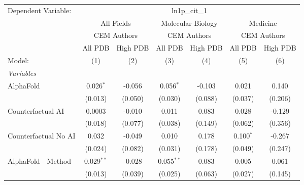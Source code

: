 \begingroup
\centering
\begin{tabular}{lcccccc}
   \tabularnewline \midrule \midrule
   Dependent Variable: & \multicolumn{6}{c}{ln1p\_cit\_1}\\
 & \multicolumn{2}{c}{All Fields} & \multicolumn{2}{c}{Molecular Biology} & \multicolumn{2}{c}{Medicine} \\
\cmidrule(lr){2-3} \cmidrule(lr){4-5} \cmidrule(lr){6-7}
 & \multicolumn{2}{c}{CEM Authors} & \multicolumn{2}{c}{CEM Authors} & \multicolumn{2}{c}{CEM Authors} \\
\cmidrule(lr){2-3} \cmidrule(lr){4-5} \cmidrule(lr){6-7}
 & \multicolumn{1}{c}{All PDB} & \multicolumn{1}{c}{High PDB} & \multicolumn{1}{c}{All PDB} & \multicolumn{1}{c}{High PDB} & \multicolumn{1}{c}{All PDB} & \multicolumn{1}{c}{High PDB} \\
\cmidrule(lr){2-2} \cmidrule(lr){3-3} \cmidrule(lr){4-4} \cmidrule(lr){5-5} \cmidrule(lr){6-6} \cmidrule(lr){7-7}
   Model:                                                     & (1)          & (2)           & (3)          & (4)     & (5)         & (6)\\  
   \midrule
   \emph{Variables}\\
   AlphaFold                                                  & 0.026$^{*}$  & -0.056        & 0.056$^{*}$  & -0.103  & 0.021       & 0.140\\   
                                                              & (0.013)      & (0.050)       & (0.030)      & (0.088) & (0.037)     & (0.206)\\   
   Counterfactual AI                                          & 0.0003       & -0.010        & 0.011        & 0.083   & 0.028       & -0.129\\   
                                                              & (0.018)      & (0.077)       & (0.038)      & (0.149) & (0.062)     & (0.356)\\   
   Counterfactual No AI                                       & 0.032        & -0.049        & 0.010        & 0.178   & 0.100$^{*}$ & -0.267\\   
                                                              & (0.024)      & (0.082)       & (0.031)      & (0.178) & (0.049)     & (0.247)\\   
   AlphaFold - Method                                         & 0.029$^{**}$ & -0.028        & 0.055$^{**}$ & 0.083   & 0.005       & 0.061\\   
                                                              & (0.013)      & (0.039)       & (0.025)      & (0.063) & (0.027)     & (0.145)\\   

\end{tabular}

